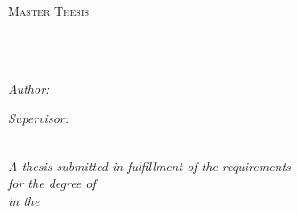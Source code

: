 \documentclass[
12pt, %
oneside, %
english, %
onehalfspacing, %
nolistspacing, %
liststotoc, %
parskip, %
headsepline, %
]{MastersDoctoralThesis} %
\author{Anatolii \textsc{Stehnii}} %
\begin{document}
\frontmatter %

\pagestyle{plain} %


\begin{titlepage}
\begin{center}

\vspace{1.5cm}
{\scshape\LARGE \univname\par}\vspace{1.2cm} %
\textsc{\Large Master Thesis}\\[0.5cm] %

\HRule \\[0.2cm] %
{\huge \bfseries \ttitle\par}\vspace{0.2cm} %
\HRule \\[0.8cm] %
 
\begin{minipage}[t]{0.4\textwidth}
\begin{flushleft} \large
\emph{Author:}\\
{\authorname}
\end{flushleft}
\end{minipage}
\begin{minipage}[t]{0.4\textwidth}
\begin{flushright} \large
\emph{Supervisor:} \\
{\supname}  
\end{flushright}
\end{minipage}\\[1cm]
 

\large \textit{A thesis submitted in fulfillment of the requirements\\ for the degree of \degreename}\\[0.3cm] %
\textit{in the}\\[0.4cm]
\groupname\\\deptname\\[1cm] %
 

\end{center}
\end{titlepage}
\end{document}

